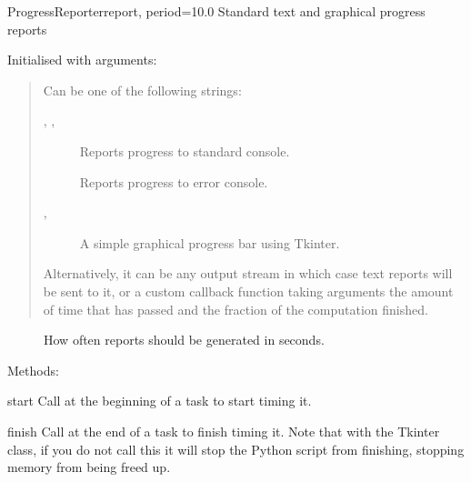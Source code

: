 \documentclass[letterpaper,10pt,english]{manual}
\begin{document}
\hypertarget{brian.utils.progressreporting.ProgressReporter}{}\begin{classdesc}{ProgressReporter}{report, period=10.0}
Standard text and graphical progress reports

Initialised with arguments:

\begin{quote}

Can be one of the following strings:
\begin{description}
\item[, , ] \leavevmode
Reports progress to standard console.

\item[] \leavevmode
Reports progress to error console.

\item[, ] \leavevmode
A simple graphical progress bar using Tkinter.

\end{description}

Alternatively, it can be any output stream in which
case text reports will be sent to it, or a custom callback function
 taking arguments 
the amount of time that has passed and  the fraction of
the computation finished.
\end{quote}
\begin{description}
\item[] \leavevmode
How often reports should be generated in seconds.

\end{description}

Methods:

\hypertarget{brian.ProgressReporter.start}{}\begin{methoddesc}{start}{}
Call at the beginning of a task to start timing it.
\end{methoddesc}

\hypertarget{brian.ProgressReporter.finish}{}\begin{methoddesc}{finish}{}
Call at the end of a task to finish timing it. Note that
with the Tkinter class, if you do not call this it will
stop the Python script from finishing, stopping memory
from being freed up.
\end{methoddesc}


\end{classdesc}
\end{document}
